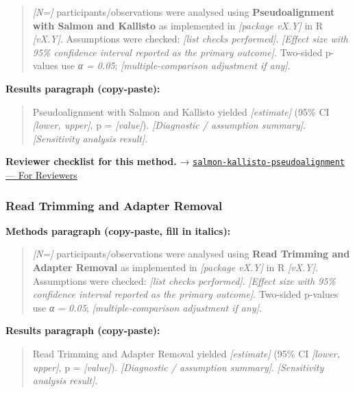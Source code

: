 \documentclass[
]{article}
\begin{document}
\begin{quote}
\emph{{[}N={]}} participants/observations were analysed using
\textbf{Pseudoalignment with Salmon and Kallisto} as implemented in
\emph{{[}package vX.Y{]}} in R \emph{{[}vX.Y{]}}. Assumptions were
checked: \emph{{[}list checks performed{]}}. \emph{{[}Effect size with
95\% confidence interval reported as the primary outcome{]}}. Two-sided
p-values use \emph{α = 0.05}; \emph{{[}multiple-comparison adjustment if
any{]}}.
\end{quote}

\textbf{Results paragraph (copy-paste):}

\begin{quote}
Pseudoalignment with Salmon and Kallisto yielded \emph{{[}estimate{]}}
(95\% CI \emph{{[}lower, upper{]}}, p = \emph{{[}value{]}}).
\emph{{[}Diagnostic / assumption summary{]}}. \emph{{[}Sensitivity
analysis result{]}}.
\end{quote}

\textbf{Reviewer checklist for this method.} →
\href{../chapters/12-bioinformatics/salmon-kallisto-pseudoalignment.Rmd\#for-reviewers}{\texttt{salmon-kallisto-pseudoalignment}
--- For Reviewers}

\subsubsection{Read Trimming and Adapter
Removal}\label{read-trimming-and-adapter-removal}

\textbf{Methods paragraph (copy-paste, fill in italics):}

\begin{quote}
\emph{{[}N={]}} participants/observations were analysed using
\textbf{Read Trimming and Adapter Removal} as implemented in
\emph{{[}package vX.Y{]}} in R \emph{{[}vX.Y{]}}. Assumptions were
checked: \emph{{[}list checks performed{]}}. \emph{{[}Effect size with
95\% confidence interval reported as the primary outcome{]}}. Two-sided
p-values use \emph{α = 0.05}; \emph{{[}multiple-comparison adjustment if
any{]}}.
\end{quote}

\textbf{Results paragraph (copy-paste):}

\begin{quote}
Read Trimming and Adapter Removal yielded \emph{{[}estimate{]}} (95\% CI
\emph{{[}lower, upper{]}}, p = \emph{{[}value{]}}). \emph{{[}Diagnostic
/ assumption summary{]}}. \emph{{[}Sensitivity analysis result{]}}.
\end{quote}
\end{document}
